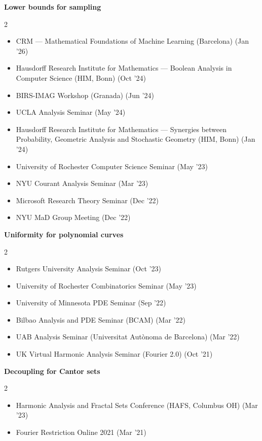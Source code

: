 \textbf{Lower bounds for sampling}
\nopagebreak
\begin{small}
\begin{multicols}{2}
\begin{itemize}\setlength\itemsep{0pt}
  \item CRM — Mathematical Foundations of Machine Learning (Barcelona) (Jan '26)
  \item Hausdorff Research Institute for Mathematics — Boolean Analysis in Computer Science (HIM, Bonn) (Oct '24)
  \item BIRS-IMAG Workshop (Granada) (Jun '24)
  \item UCLA Analysis Seminar (May '24)
  \item Hausdorff Research Institute for Mathematics — Synergies between Probability, Geometric Analysis and Stochastic Geometry (HIM, Bonn) (Jan '24)
  \item University of Rochester Computer Science Seminar (May '23)
  \item NYU Courant Analysis Seminar (Mar '23)
  \item Microsoft Research Theory Seminar (Dec '22)
  \item NYU MaD Group Meeting (Dec '22)
\end{itemize}
\end{multicols}
\end{small}

\textbf{Uniformity for polynomial curves}
\nopagebreak
\begin{small}
\begin{multicols}{2}
\begin{itemize}\setlength\itemsep{0pt}
  \item Rutgers University Analysis Seminar (Oct '23)
  \item University of Rochester Combinatorics Seminar (May '23)
  \item University of Minnesota PDE Seminar (Sep '22)
  \item Bilbao Analysis and PDE Seminar (BCAM) (Mar '22)
  \item UAB Analysis Seminar (Universitat Autònoma de Barcelona) (Mar '22)
  \item UK Virtual Harmonic Analysis Seminar (Fourier 2.0) (Oct '21)
\end{itemize}
\end{multicols}
\end{small}

\textbf{Decoupling for Cantor sets}
\nopagebreak
\begin{small}
\begin{multicols}{2}
\begin{itemize}\setlength\itemsep{0pt}
  \item Harmonic Analysis and Fractal Sets Conference (HAFS, Columbus OH) (Mar '23)
  \item Fourier Restriction Online 2021 (Mar '21)
\end{itemize}
\end{multicols}
\end{small}

